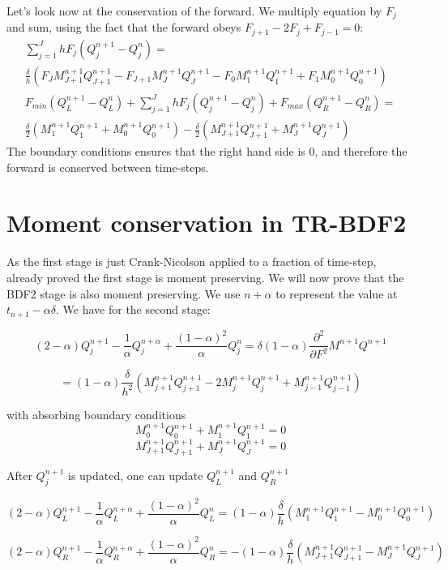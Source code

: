 \documentclass[]{rAMF2e}
\begin{document}
Let's look now at the conservation of the forward. We multiply equation by $F_j$ and sum, using the fact that the forward obeys $F_{j+1}-2F_{j}+F_{j-1}=0$:
\begin{eqnarray}
\sum_{j=1}^{J} h F_j (Q_j^{n+1}-Q_j^n) = \\ \frac{\delta}{h}\left(F_J M_{J+1}^{n+1}Q_{J+1}^{n+1}-F_{J+1}M_J^{n+1}Q_J^{n+1}-F_0 M_1^{n+1}Q_1^{n+1}+F_1 M_0^{n+1}Q_0^{n+1}\right)\\
F_{min}(Q_L^{n+1}-Q_L^n)+ \sum_{j=1}^{J} h F_j (Q_j^{n+1}-Q_j^n) +F_{max}(Q_R^{n+1}-Q_R^n) = \\ \frac{\delta}{2}\left(M_{1}^{n+1}Q_{1}^{n+1}+M_0^{n+1}Q_0^{n+1}\right)-\frac{\delta}{2}\left(M_{J+1}^{n+1}Q_{J+1}^{n+1}+M_J^{n+1}Q_J^{n+1}\right)
\end{eqnarray}
The boundary conditions ensures that the right hand side is 0, and therefore the forward is conserved between time-steps.
 
\section{Moment conservation in TR-BDF2}
As the first stage is just Crank-Nicolson applied to a fraction of time-step, \citep{hagan2013arbitrage} already proved the first stage is moment preserving. We will now prove that the BDF2 stage is also moment preserving. We use $n+\alpha$ to represent the value at $t_{n+1}-\alpha \delta$. We have for the second stage:

$$(2-\alpha)Q_j^{n+1}-\frac{1}{\alpha}Q_j^{n+\alpha}+\frac{(1-\alpha)^2}{\alpha}Q_j^n=\delta(1-\alpha)\frac{\partial^2}{\partial F^2}M^{n+1}Q^{n+1}$$ 

$$= (1-\alpha)\frac{\delta}{h^2}\left(M_{j+1}^{n+1}Q_{j+1}^{n+1}-2M_{j}^{n+1}Q_{j}^{n+1}+M_{j-1}^{n+1}Q_{j-1}^{n+1}\right)$$

with absorbing boundary conditions
$$M_0^{n+1}Q_0^{n+1} + M_1^{n+1}Q_1^{n+1} = 0 $$
$$M_{J+1}^{n+1}Q_{J+1}^{n+1} + M_J^{n+1}Q_J^{n+1} = 0 $$

After $Q_j^{n+1}$ is updated, one can update $Q_L^{n+1}$ and $Q_R^{n+1}$

$$(2-\alpha)Q_L^{n+1}-\frac{1}{\alpha}Q_L^{n+\alpha}+\frac{(1-\alpha)^2}{\alpha}Q_L^n=(1-\alpha)\frac{\delta}{h}\left(M_1^{n+1}Q_1^{n+1} - M_0^{n+1}Q_0^{n+1}\right)$$

$$(2-\alpha)Q_R^{n+1}-\frac{1}{\alpha}Q_R^{n+\alpha}+\frac{(1-\alpha)^2}{\alpha}Q_R^n=-(1-\alpha)\frac{\delta}{h}\left(M_{J+1}^{n+1}Q_{J+1}^{n+1} - M_J^{n+1}Q_J^{n+1}\right)$$
\end{document}
